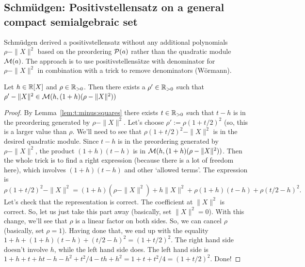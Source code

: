 \subsection{Schmüdgen: Positivstellensatz on a general compact semialgebraic set}

Schmüdgen derived a positivstellensatz without any additional polynomials $\rho - \|X\|^2$ based on the preordering $\mathcal{P}(a)$ rather than the quadratic module $\mathcal{M}(a)$. The approach is to use positivstellensätze with denominator for $\rho - \|X\|^2$ in combination with a trick to remove denominators (Wörmann). 

\begin{lemma}
	\label{lem:woer:trick}
	Let $h \in \mathbb{R}[X]$ and $\rho \in \mathbb{R}_{>0}$. Then there exists a $\rho' \in \mathbb{R}_{>0}$ such that $\rho' - \|X\|^2 \in \mathcal{M}(h, (1+h) ( \rho - \|X\|^2))$
\end{lemma}
\begin{proof}
	By Lemma~\ref{lem:t:minus:squares} there exists $t \in \mathbb{R}_{>0}$ such that $t- h$ is in the preordering generated by $\rho -\|X\|^2$. Let's choose $\rho' := \rho (1 + t/2)^2$ (so, this is a larger value than $\rho$. We'll need to see that $\rho(1+ t/2)^2 - \|X\|^2$ is in the desired quadratic module. Since $t- h$ is in the preordering generated by $\rho -\|X\|^2$, the product $(1+h)(t-h)$ is in $\mathcal{M}(h,(1+h)(\rho-\|X\|^2))$. Then the whole trick is to find a right expression (because there is a lot of freedom here), which involves $(1+h)(t-h)$ and other `allowed terms'. The expression is 
	\[
		\rho (1+ t/2)^2 -\|X\|^2 = (1+h)(\rho - \|X\|^2) + h \|X\|^2 + \rho (1+h) (t-h) + \rho (t/2 -h)^2.
	\]
	Let's check that the representation is correct. The coefficient at  $\|X\|^2$ is correct. So, let us just take this part away (basically, set $\|X\|^2 = 0$). With this change, we'll see that $\rho$ is a linear factor on both sides. So, we can cancel $\rho$ (basically, set $\rho=1$). Having done that, we end up with the equality $1+ h + (1+h) (t-h) + (t/2-h)^2 = (1+t/2)^2$. The right hand side doesn't involve $h$, while the left hand side does. The left hand side is $1+ h + t + h t - h - h^2 + t^2/4 - t h + h^2 = 1 + t + t^2/4 = (1+t/2)^2$. Done!
\end{proof}

